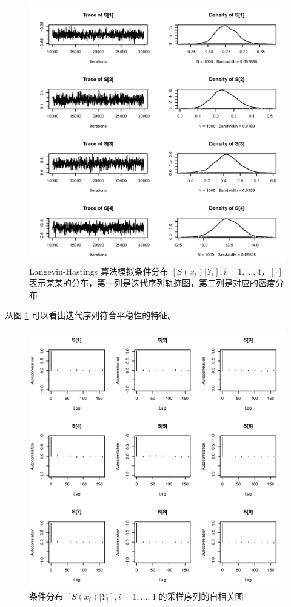 \documentclass[12pt,a4paper,UTF8,twoside]{book}
\theoremstyle{definition}
\theoremstyle{definition}
\theoremstyle{definition}
\theoremstyle{remark}
\begin{document}
\begin{figure}

{\centering \includegraphics[width=0.7\linewidth]{figures/rongelap-mcml-diagnosis-trace-9} 

}

\caption{Langevin-Hastings 算法模拟条件分布
\([S(x_{i})|Y_{i}], i = 1,\ldots,4\)，\([\cdot]\)
表示某某的分布，第一列是迭代序列轨迹图，第二列是对应的密度分布}\label{fig:rongelap-trace-plot}
\end{figure}

从图 \ref{fig:rongelap-trace-plot} 可以看出迭代序列符合平稳性的特征。

\begin{figure}

{\centering \includegraphics[width=0.7\linewidth]{figures/rongelap-mcml-diagnosis-acf-9} 

}

\caption{条件分布 \([S(x_{i})|Y_{i}], i = 1, \ldots, 4\)
的采样序列的自相关图}\label{fig:rongelap-acf-plot}
\end{figure}
\end{document}
